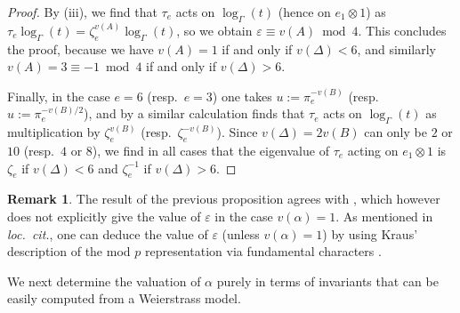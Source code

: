 \documentclass{amsart}
\theoremstyle{definition}
\newtheorem{remark}[theorem]{Remark}
\numberwithin{theorem}{section}
\numberwithin{equation}{section}
\begin{document}
\begin{proof}
By (iii), we find that $\tau_e$ acts on $\log_\Gamma(t)$ (hence on $e_1 \otimes 1$) as $\tau_e \log_\Gamma(t) = \zeta_e^{v(A)} \log_\Gamma(t)$, so we obtain $\varepsilon \equiv v(A) \bmod{4}$. This concludes the proof, because we have $v(A)=1$ if and only if $v(\Delta)<6$, and similarly $v(A)=3 \equiv -1 \bmod{4}$ if and only if $v(\Delta)>6$.

Finally, in the case $e=6$ (resp.~$e=3$) one takes $u:=\pi_e^{-v(B)}$ (resp.~$u:=\pi_e^{-v(B)/2}$), and by a similar calculation finds that $\tau_e$ acts on $\log_\Gamma(t)$ as multiplication by $\zeta_e^{v(B)}$ (resp.~$\zeta_e^{-v(B)}$). Since $v(\Delta)=2v(B)$ can only be $2$ or $10$ (resp.~$4$ or $8$), we find in all cases that the eigenvalue of $\tau_e$ acting on $e_1 \otimes 1$ is $\zeta_e$ if $v(\Delta)<6$ and $\zeta_e^{-1}$ if $v(\Delta)>6$. \end{proof}

\begin{remark}
    The result of the previous proposition agrees with \cite[Remarque on p.~133]{Volkov}, which however does not explicitly give the value of $\varepsilon$ in the case $v(\alpha)=1$. %
    As mentioned in \textit{loc.~cit.}, one can deduce the value of $\varepsilon$ (unless $v(\alpha)=1$) by using Kraus' description of the mod $p$ representation via fundamental characters \cite[\S 2.3.2, Proposition 2 and Lemme 2]{KrausPoidsConducteur}.

\end{remark}

We next determine the valuation of $\alpha$ purely in terms of invariants that can be easily computed from a Weierstrass model.
\end{document}
